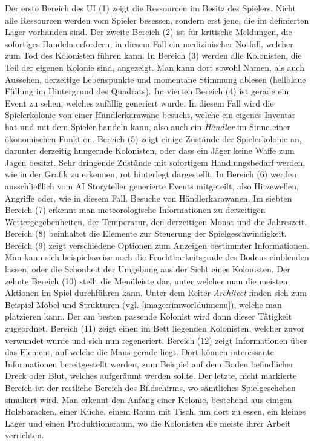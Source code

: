 Der erste Bereich des UI (1) zeigt die Ressourcen im Besitz des Spielers. Nicht alle Ressourcen werden vom Spieler besessen, sondern erst jene, die im definierten Lager vorhanden sind.
Der zweite Bereich (2) ist für kritische Meldungen, die sofortiges Handeln erfordern, in diesem Fall ein medizinischer Notfall, welcher zum Tod des Kolonisten führen kann.
In Bereich (3) werden alle Kolonisten, die Teil der eigenen Kolonie sind, angezeigt. Man kann dort sowohl Namen, als auch Aussehen, derzeitige Lebenspunkte und momentane Stimmung ablesen (hellblaue Füllung im Hintergrund des Quadrats).
Im vierten Bereich (4) ist gerade ein Event zu sehen, welches zufällig generiert wurde. In diesem Fall wird die Spielerkolonie von einer Händlerkarawane besucht, welche ein eigenes Inventar hat und mit dem Spieler handeln kann, also auch ein \textit{Händler} im Sinne einer ökonomischen Funktion.
Bereich (5) zeigt einige Zustände der Spielerkolonie an, darunter derzeitig hungernde Kolonisten, oder dass ein Jäger keine Waffe zum Jagen besitzt. Sehr dringende Zustände mit sofortigem Handlungsbedarf werden, wie in der Grafik zu erkennen, rot hinterlegt dargestellt.
In Bereich (6) werden ausschließlich vom AI Storyteller generierte Events mitgeteilt, also Hitzewellen, Angriffe oder, wie in diesem Fall, Besuche von Händlerkarawanen.
Im siebten Bereich (7) erkennt man meteorologische Informationen zu derzeitigen Wettergegebenheiten, der Temperatur, den derzeitigen Monat und die Jahreszeit.
Bereich (8) beinhaltet die Elemente zur Steuerung der Spielgeschwindigkeit.
Bereich (9) zeigt verschiedene Optionen zum Anzeigen bestimmter Informationen. Man kann sich beispielsweise noch die Fruchtbarkeitsgrade des Bodens einblenden lassen, oder die Schönheit der Umgebung aus der Sicht eines Kolonisten.
Der zehnte Bereich (10) stellt die Menüleiste dar, unter welcher man die meisten Aktionen im Spiel durchführen kann. Unter dem Reiter \textit{Architect} finden sich zum Beispiel Möbel und Strukturen (vgl. \autoref{image:rimworlduimenu}), welche man platzieren kann. Der am besten passende Kolonist wird dann dieser Tätigkeit zugeordnet. Bereich (11) zeigt einen im Bett liegenden Kolonisten, welcher zuvor verwundet wurde und sich nun regeneriert. Bereich (12) zeigt Informationen über das Element, auf welche die Maus gerade liegt. Dort können interessante Informationen bereitgestellt werden, zum Beispiel auf dem Boden befindlicher Dreck oder Blut, welches aufgeräumt werden sollte. Der letzte, nicht markierte Bereich ist der restliche Bereich des Bildschirms, wo sämtliches Spielgeschehen simuliert wird. Man erkennt den Anfang einer Kolonie, bestehend aus einigen Holzbaracken, einer Küche, einem Raum mit Tisch, um dort zu essen, ein kleines Lager und einen Produktionsraum, wo die Kolonisten die meiste ihrer Arbeit verrichten.

